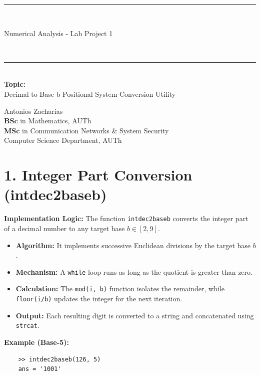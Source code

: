 \documentclass[12pt, a4paper]{article}
\newcommand{\HRule}{\rule{\linewidth}{0.5mm}}
\begin{document}
	
\begin{titlepage}
	\begin{center}
		\HRule \\[0.6cm] 
		{\huge \bfseries \strut Numerical Analysis - Lab Project 1} \\[0.4cm] 
		\HRule \\[1.5cm]
		{\large \textbf{Topic:}} \\
		{\large Decimal to Base-b Positional System Conversion Utility} \\[2cm]
		
		\vfill 
		\begin{doublespacing}
			{\huge Antonios Zacharias\\}
			{\large \textbf{BSc} in Mathematics, AUTh\\}
			{\large \textbf{MSc} in Communication Networks \& System Security \\
			Computer Science Department, AUTh}
		\end{doublespacing}
	
		\vspace*{1cm} 
		\end{center}
\end{titlepage}	
	
\section*{1. Integer Part Conversion (intdec2baseb)}
\textbf{Implementation Logic:} The function \texttt{intdec2baseb} converts the integer part of a decimal number to any target base $b \in [2, 9]$.

\begin{itemize}[label=--]
	\item \textbf{Algorithm:} It implements successive Euclidean divisions by the target base $b$.
	\item \textbf{Mechanism:} A \texttt{while} loop runs as long as the quotient is greater than zero.
	\item \textbf{Calculation:} The \texttt{mod(i, b)} function isolates the remainder, while \texttt{floor(i/b)} updates the integer for the next iteration.
	\item \textbf{Output:} Each resulting digit is converted to a string and concatenated using \texttt{strcat}.
\end{itemize}

\textbf{Example (Base-5):}
\begin{verbatim}
	>> intdec2baseb(126, 5)
	ans = '1001'
\end{verbatim}
\end{document}
